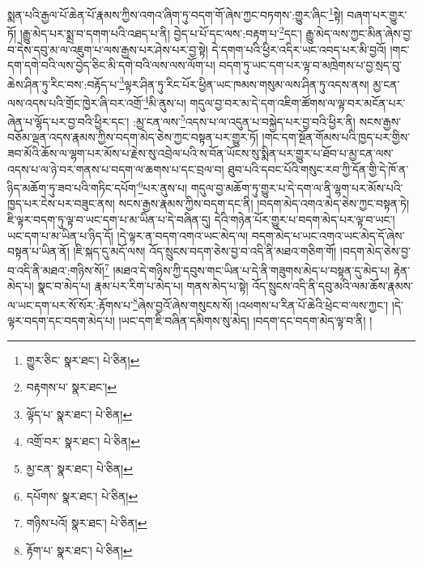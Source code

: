 སྨན་པའི་རྒྱལ་པོ་ཆེན་པོ་རྣམས་ཀྱིས་འགའ་ཞིག་ཏུ་བདག་གོ་ཞེས་ཀྱང་བཏགས་:གྱུར་ཞིང་\footnote{གྱུར་ཅིང་  སྣར་ཐང་།  པེ་ཅིན། }སྟེ། བཞག་པར་གྱུར་ཏོ། །རྒྱུ་མེད་པར་སྨྲ་བ་དགག་པའི་འཐད་པ་ནི། བྱེད་པ་པོ་དང་ལས་:བརྟག་པ་\footnote{བརྟགས་པ་  སྣར་ཐང་། }དང་། རྒྱུ་མེད་ལས་ཀྱང་མིན་ཞེས་བྱ་བ་དེས་དབུ་མ་ལ་འཇུག་པ་ལས་རྒྱས་པར་ཤེས་པར་བྱ་སྟེ། དེ་དགག་པའི་ཕྱིར་འདིར་ཡང་འབད་པར་མི་བྱའོ། །གང་དག་དགེ་བའི་ལས་བྱེད་ཅིང་མི་དགེ་བའི་ལས་ལས་ལོག་པ། བདག་ཏུ་ཡང་དག་པར་ལྟ་བ་མཁྲེགས་པ་བྱ་སྲད་བུ་ཆེས་ཤིན་ཏུ་རིང་བས་:བརྟོད་པ་\footnote{ལྟོད་པ་  སྣར་ཐང་།  པེ་ཅིན། }ལྟར་ཤིན་ཏུ་རིང་པོར་ཕྱིན་ཡང་ཁམས་གསུམ་ལས་ཤིན་ཏུ་འདས་ནས། མྱ་ངན་ལས་འདས་པའི་གྲོང་ཁྱེར་ཞི་བར་འགྲོ་\footnote{འགྲོ་བར་  སྣར་ཐང་།  པེ་ཅིན། }མི་ནུས་པ། གདུལ་བྱ་བར་མ་དེ་དག་འཇིག་ཚོགས་ལ་ལྟ་བར་མངོན་པར་ཞེན་པ་ལྷོད་པར་བྱ་བའི་ཕྱིར་དང་། :མྱ་ངན་ལས་\footnote{མྱ་ངན་  སྣར་ཐང་།  པེ་ཅིན། }འདས་པ་ལ་འདུན་པ་བསྐྱེད་པར་བྱ་བའི་ཕྱིར་ནི། སངས་རྒྱས་བཅོམ་ལྡན་འདས་རྣམས་ཀྱིས་བདག་མེད་ཅེས་ཀྱང་བསྟན་པར་གྱུར་ཏོ། །གང་དག་སྔོན་གོམས་པའི་ཁྱད་པར་གྱིས་ཟབ་མོའི་ཆོས་ལ་ལྷག་པར་མོས་པ་རྗེས་སུ་འབྲེལ་པའི་ས་བོན་ཡོངས་སུ་སྨིན་པར་གྱུར་པ་ཐོབ་པ་མྱ་ངན་ལས་འདས་པ་ལ་ཉེ་བར་གནས་པ་བདག་ལ་ཆགས་པ་དང་བྲལ་བ། ཐུབ་པའི་དབང་པོའི་གསུང་རབ་ཀྱི་དོན་གྱི་དེ་ཁོ་ན་ཉིད་མཆོག་ཏུ་ཟབ་པའི་གཏིང་དཔོག་\footnote{དཔོགས་  སྣར་ཐང་།  པེ་ཅིན། }པར་ནུས་པ། གདུལ་བྱ་མཆོག་ཏུ་གྱུར་པ་དེ་དག་ལ་ནི་ལྷག་པར་མོས་པའི་ཁྱད་པར་ངེས་པར་བཟུང་ནས། སངས་རྒྱས་རྣམས་ཀྱིས་བདག་དང་ནི། །བདག་མེད་འགའ་མེད་ཅེས་ཀྱང་བསྟན་ཏེ། ཇི་ལྟར་བདག་ཏུ་ལྟ་བ་ཡང་དག་པ་མ་ཡིན་པ་དེ་བཞིན་དུ། དེའི་གཉེན་པོར་གྱུར་པ་བདག་མེད་པར་ལྟ་བ་ཡང་། ཡང་དག་པ་མ་ཡིན་པ་ཉིད་དོ། །དེ་ལྟར་ན་བདག་འགའ་ཡང་མེད་ལ། བདག་མེད་པ་ཡང་འགའ་ཡང་མེད་དོ་ཞེས་བསྟན་པ་ཡིན་ནོ། །ཇི་སྐད་དུ་མདོ་ལས། འོད་སྲུངས་བདག་ཅེས་བྱ་བ་འདི་ནི་མཐའ་གཅིག་གོ། །བདག་མེད་ཅེས་བྱ་བ་འདི་ནི་མཐའ་:གཉིས་སོ།\footnote{གཉིས་པའོ།  སྣར་ཐང་།  པེ་ཅིན། } །མཐའ་དེ་གཉིས་ཀྱི་དབུས་གང་ཡིན་པ་དེ་ནི་གཟུགས་མེད་པ་བསྟན་དུ་མེད་པ། རྟེན་མེད་པ། སྣང་བ་མེད་པ། རྣམ་པར་རིག་པ་མེད་པ། གནས་མེད་པ་སྟེ། འོད་སྲུངས་འདི་ནི་དབུ་མའི་ལམ་ཆོས་རྣམས་ལ་ཡང་དག་པར་སོ་སོར་:རྟོགས་པ་\footnote{རྟོག་པ་  སྣར་ཐང་།  པེ་ཅིན། }ཞེས་བྱའོ་ཞེས་གསུངས་སོ། །འཕགས་པ་རིན་པོ་ཆེའི་ཕྲེང་བ་ལས་ཀྱང་། །དེ་ལྟར་བདག་དང་བདག་མེད་པ། །ཡང་དག་ཇི་བཞིན་དམིགས་སུ་མེད། །བདག་དང་བདག་མེད་ལྟ་བ་ནི། །
